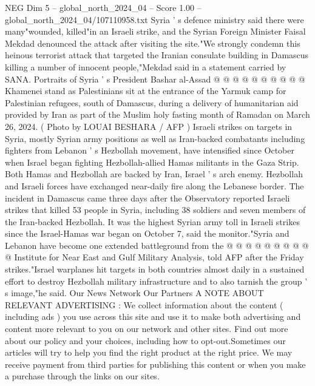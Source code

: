 \begin{textsample}{NEG Dim 5 – global\_north\_2024\_04 – Score 1.00 – global\_north\_2024\_04/107110958.txt}
Syria ' s defence ministry said there were many"wounded, killed"in an Israeli strike, and the Syrian Foreign Minister Faisal Mekdad denounced the attack after visiting the site."We strongly condemn this heinous terrorist attack that targeted the Iranian consulate building in Damascus killing a number of innocent people,"Mekdad said in a statement carried by SANA.
Portraits of Syria ' s President Bashar al-Assad @ @ @ @ @ @ @ @ @ @ Khamenei stand as Palestinians sit at the entrance of the Yarmuk camp for Palestinian refugees, south of Damascus, during a delivery of humanitarian aid provided by Iran as part of the Muslim holy fasting month of Ramadan on March 26, 2024. ( Photo by LOUAI BESHARA / AFP ) Israeli strikes on targets in Syria, mostly Syrian army positions as well as Iran-backed combatants including fighters from Lebanon ' s Hezbollah movement, have intensified since October when Israel began fighting Hezbollah-allied Hamas militants in the Gaza Strip.
Both Hamas and Hezbollah are backed by Iran, Israel ' s arch enemy.
Hezbollah and Israeli forces have exchanged near-daily fire along the Lebanese border.
The incident in Damascus came three days after the Observatory reported Israeli strikes that killed 53 people in Syria, including 38 soldiers and seven members of the Iran-backed Hezbollah.
It was the highest Syrian army toll in Israeli strikes since the Israel-Hamas war began on October 7, said the monitor."Syria and Lebanon have become one extended battleground from the @ @ @ @ @ @ @ @ @ @ Institute for Near East and Gulf Military Analysis, told AFP after the Friday strikes."Israel warplanes hit targets in both countries almost daily in a sustained effort to destroy Hezbollah military infrastructure and to also tarnish the group ' s image,"he said.
Our News Network Our Partners A NOTE ABOUT RELEVANT ADVERTISING : We collect information about the content ( including ads ) you use across this site and use it to make both advertising and content more relevant to you on our network and other sites.
Find out more about our policy and your choices, including how to opt-out.Sometimes our articles will try to help you find the right product at the right price.
We may receive payment from third parties for publishing this content or when you make a purchase through the links on our sites.

\end{textsample}
